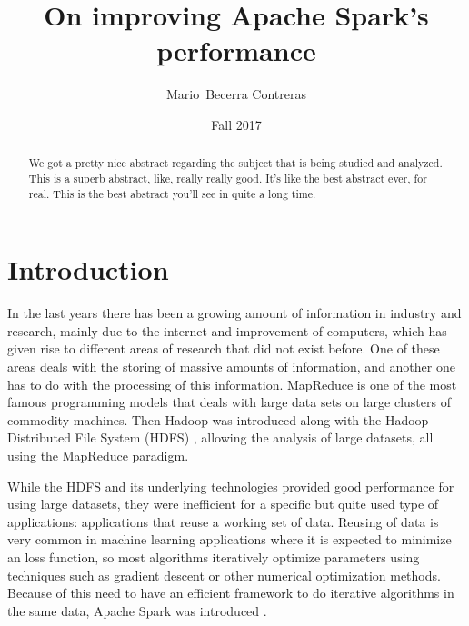 \documentclass{article}
\begin{document}

\title{On improving Apache Spark's performance}

\author{Mario~Becerra Contreras}

\date{Fall 2017}


\maketitle

\begin{abstract}

We got a pretty nice abstract regarding the subject that is being studied and analyzed. This is a superb abstract, like, really really good. It's like the best abstract ever, for real. This is the best abstract you'll see in quite a long time.

\end{abstract}

\section{Introduction}

In the last years there has been a growing amount of information in industry and research, mainly due to the internet and improvement of computers, which has given rise to different areas of research that did not exist before. One of these areas deals with the storing of massive amounts of information, and another one has to do with the processing of this information. MapReduce \cite{dean2008mapreduce} is one of the most famous programming models that deals with large data sets on large clusters of commodity machines. Then Hadoop was introduced along with the Hadoop Distributed File System (HDFS) \cite{Shvachko2010}, allowing the analysis of large datasets, all using the MapReduce paradigm.

While the HDFS and its underlying technologies provided good performance for using large datasets, they were inefficient for a specific but quite used type of applications: applications that reuse a working set of data. Reusing of data is very common in machine learning applications where it is expected to minimize an loss function, so most algorithms iteratively optimize parameters using techniques such as gradient descent or other numerical optimization methods. Because of this need to have an efficient framework to do iterative algorithms in the same data, Apache Spark was introduced \cite{zaharia_resilient_2012} \cite{zaharia_spark:_2010}.
\end{document}
